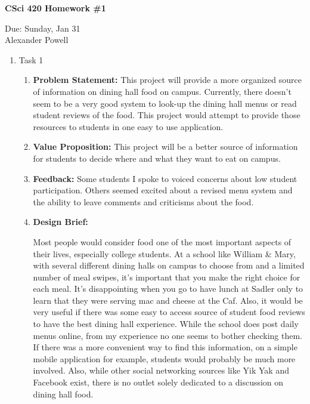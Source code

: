 \documentclass[11pt]{article}
\begin{document}
\begin{center}             %
\begin{LARGE}
{\bf CSci 420 Homework \#1}
\end{LARGE}
\vskip 0.25cm      %

Due: Sunday, Jan 31\\  %
Alexander Powell
\end{center}

\begin{enumerate}
\item
Task 1
\begin{enumerate}

\item
\textbf{Problem Statement:}
This project will provide a more organized source of information on dining hall food on campus.  Currently, there doesn't seem to be a very good system to look-up the dining hall menus or read student reviews of the food.  This project would attempt to provide those resources to students in one easy to use application.  

\item
\textbf{Value Proposition:}
This project will be a better source of information for students to decide where and what they want to eat on campus.  

\item
\textbf{Feedback:}
Some students I spoke to voiced concerns about low student participation.  Others seemed excited about a revised menu system and the ability to leave comments and criticisms about the food.  

\item
\textbf{Design Brief:}

\setlength{\parindent}{10ex} Most people would consider food one of the most important aspects of their lives, especially college students.  At a school like William \& Mary, with several different dining halls on campus to choose from and a limited number of meal swipes, it's important that you make the right choice for each meal.  It's disappointing when you go to have lunch at Sadler only to learn that they were serving mac and cheese at the Caf.  Also, it would be very useful if there was some easy to access source of student food reviews to have the best dining hall experience.  While the school does post daily menus online, from my experience no one seems to bother checking them.  If there was a more convenient way to find this information, on a simple mobile application for example, students would probably be much more involved.  Also, while other social networking sources like Yik Yak and Facebook exist, there is no outlet solely dedicated to a discussion on dining hall food.  


\end{enumerate}
\end{enumerate}
\end{document}
